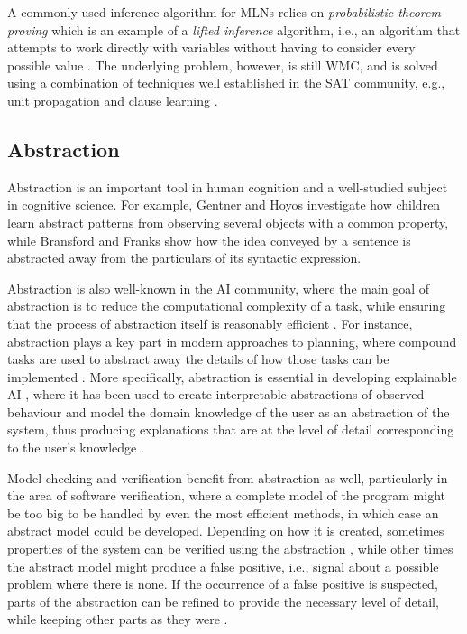 \documentclass{article}
\begin{document}
A commonly used inference algorithm for MLNs relies on \emph{probabilistic
  theorem proving}
\cite{DBLP:journals/cacm/GogateD16,DBLP:journals/cib/Venugopal17}
which is an example of a \emph{lifted inference} algorithm, i.e., an algorithm
that attempts to work directly with variables without having to consider every
possible value \cite{DBLP:conf/ijcai/Poole03}. The underlying problem, however,
is still WMC, and is solved using a combination of techniques well established
in the SAT community, e.g., unit propagation and clause learning
\cite{DBLP:journals/cib/Venugopal17}.

\subsection{Abstraction}

Abstraction is an important tool in human cognition and a well-studied subject
in cognitive science. For example, Gentner and Hoyos \cite{Gentner2017-GENAAA-2}
investigate how children learn abstract patterns from observing several
objects with a common property, while Bransford and Franks
\cite{BRANSFORD1971331} show how the idea conveyed by a sentence is abstracted
away from the particulars of its syntactic expression.

Abstraction is also well-known in the AI community,
where the main goal of abstraction is to reduce the computational complexity of
a task, while ensuring that the process of abstraction itself is reasonably
efficient \cite{saitta2013abstraction}. For instance, abstraction plays a key
part in modern approaches to planning, where compound tasks are used to abstract
away the details of how those tasks can be implemented
\cite{DBLP:journals/amai/ErolHN96}. More specifically, abstraction is essential
in developing explainable AI \cite{DBLP:journals/access/AdadiB18}, where
it has been used to create interpretable abstractions of observed behaviour
\cite{DBLP:journals/corr/PenkovR17} and model the domain knowledge of the user
as an abstraction of the system, thus producing explanations that are at the
level of detail corresponding to the user's knowledge
\cite{DBLP:conf/ijcai/SreedharanSK18}.

Model checking and verification benefit from abstraction as well, particularly
in the area of software verification, where a complete model of the program
might be too big to be handled by even the most efficient methods, in which
case an abstract model could be developed. Depending on how it is created,
sometimes properties of the system can be verified using the abstraction
\cite{DBLP:journals/toplas/ClarkeGL94}, while other times the abstract model
might produce a false positive, i.e., signal about a possible problem where
there is none. If the occurrence of a false positive is suspected, parts of the
abstraction can be refined to provide the necessary level of detail, while
keeping other parts as they were
\cite{DBLP:conf/cav/ClarkeGJLV00,DBLP:conf/popl/HenzingerJMS02}.
\end{document}
